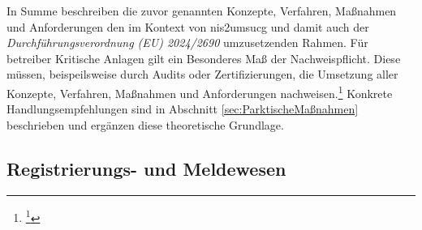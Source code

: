 \documentclass[11pt,a4paper,hidelinks]{article}   %
\begin{document}
            In Summe beschreiben die zuvor genannten Konzepte, Verfahren, Maßnahmen und Anforderungen den im Kontext von \gls{nis2umsucg} und damit auch der \emph{Durchführungsverordnung (EU) 2024/2690} umzusetzenden Rahmen. Für betreiber Kritische Anlagen gilt ein Besonderes Maß der Nachweispflicht. Diese müssen, beispeilsweise durch Audits oder Zertifizierungen, die Umsetzung aller Konzepte, Verfahren, Maßnahmen und Anforderungen nachweisen.\footnote{\footcite[Vgl.][, §39]{NIS2UmsuCG}} Konkrete Handlungsempfehlungen sind in Abschnitt \ref{sec:ParktischeMaßnahmen} beschrieben und ergänzen diese theoretische Grundlage.
            
        \subsection{Registrierungs- und Meldewesen}
\end{document}
